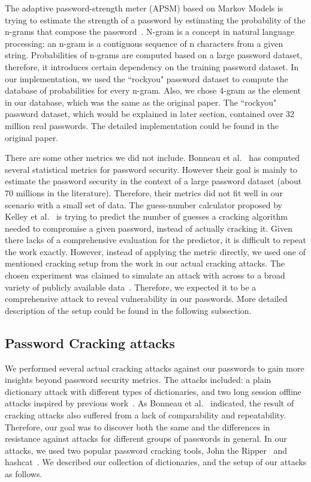 \documentclass[conference]{IEEEtran}
\begin{document}
The adaptive password-strength meter (APSM) based on Markov Models is trying to estimate the strength of a password by estimating the probability of the n-grams that compose the password~\cite{Castelluccia:2012:NDSS:markov}. N-gram is a concept in natural language processing: an n-gram is a contiguous sequence of n characters from a given string. Probabilities of n-grams are computed based on a large password dataset, therefore, it introduces certain dependency on the training password dataset. In our implementation, we used the ``rockyou" password dataset to compute the database of probabilities for every n-gram. Also, we chose 4-gram as the element in our database, which was the same as the original paper. The ``rockyou" password dataset, which would be explained in later section, contained over 32 million real passwords. The detailed implementation could be found in the original paper.

There are some other metrics we did not include. Bonneau et al.~\cite{Bonneau:2012:SMI:2437647.2437657} has computed several statistical metrics for password security. However their goal is mainly to estimate the password security in the context of a large password dataset (about 70 millions in the literature). Therefore, their metrics did not fit well in our scenario with a small set of data. The guess-number calculator proposed by Kelley et al.~\cite{Kelley:2012:GAM:2310656.2310715} is trying to predict the number of guesses a cracking algorithm needed to compromise a given password, instead of actually cracking it. Given there lacks of a comprehensive evaluation for the predictor, it is difficult to repeat the work exactly. However, instead of applying the metric directly, we used one of mentioned cracking setup from the work in our actual cracking attacks. The chosen experiment was claimed to simulate an attack with across to a broad variety of publicly available data~\cite{Kelley:2012:GAM:2310656.2310715}. Therefore, we expected it to be a comprehensive attack to reveal vulnerability in our passwords. More detailed description of the setup could be found in the following subsection.



\subsection{Password Cracking attacks}


We performed several actual cracking attacks against our passwords to gain more insights beyond password security metrics. The attacks included: a plain dictionary attack with different types of dictionaries, and two long session offline attacks inspired by previous work~\cite{Weir:2010:TMP:1866307.1866327, Kelley:2012:GAM:2310656.2310715}. As Bonneau et al.~\cite{Bonneau:2012:SGA:2310656.2310721} indicated, the result of cracking attacks also suffered from a lack of comparability and repeatability. Therefore, our goal was to discover both the same and the differences in resistance against attacks for different groups of passwords in general. In our attacks, we used two popular password cracking tools, John the Ripper~\cite{johntheripper} and hashcat~\cite{hashcatsoftware}. We described our collection of dictionaries, and the setup of our attacks as follows. 
\end{document}
